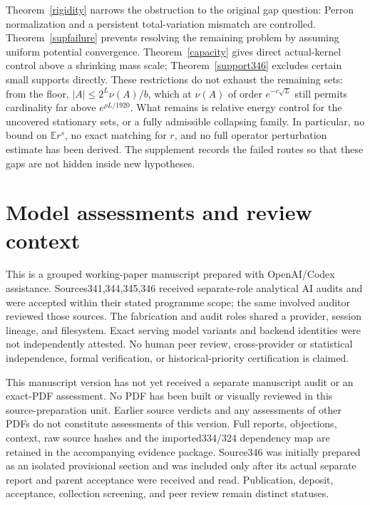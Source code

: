\documentclass[11pt]{article}
\newcommand{\E}{\mathbb E}
\begin{document}
Theorem~\ref{rigidity} narrows the obstruction to the original gap question: Perron normalization and a persistent total-variation mismatch are controlled. Theorem~\ref{supfailure} prevents resolving the remaining problem by assuming uniform potential convergence. Theorem~\ref{capacity} gives direct actual-kernel control above a shrinking mass scale; Theorem~\ref{support346} excludes certain small supports directly. These restrictions do not exhaust the remaining sets: from the floor, $|A|\leq2^L\nu(A)/b$, which at $\nu(A)$ of order $e^{-c\sqrt L}$ still permits cardinality far above $e^{\rho L/1920}$. What remains is relative energy control for the uncovered stationary sets, or a fully admissible collapsing family. In particular, no bound on $\E r^s$, no exact matching for $r$, and no full operator perturbation estimate has been derived. The supplement records the failed routes so that these gaps are not hidden inside new hypotheses.

\section{Model assessments and review context}
This is a grouped working-paper manuscript prepared with OpenAI/Codex assistance. Sources341,344,345,346 received separate-role analytical AI audits and were accepted within their stated programme scope; the same involved auditor reviewed those sources. The fabrication and audit roles shared a provider, session lineage, and filesystem. Exact serving model variants and backend identities were not independently attested. No human peer review, cross-provider or statistical independence, formal verification, or historical-priority certification is claimed.

This manuscript version has not yet received a separate manuscript audit or an exact-PDF assessment. No PDF has been built or visually reviewed in this source-preparation unit. Earlier source verdicts and any assessments of other PDFs do not constitute assessments of this version. Full reports, objections, context, raw source hashes and the imported334/324 dependency map are retained in the accompanying evidence package. Source346 was initially prepared as an isolated provisional section and was included only after its actual separate report and parent acceptance were received and read. Publication, deposit, acceptance, collection screening, and peer review remain distinct statuses.
\end{document}
